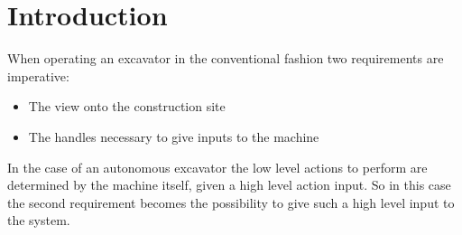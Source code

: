 \chapter{Introduction}
\label{sec:introduction}






When operating an excavator in the conventional fashion two requirements are imperative: \begin{itemize}
    \item The view onto the construction site
    \item The handles necessary to give inputs to the machine
\end{itemize}
In the case of an autonomous excavator the low level actions to perform are determined by the machine itself, given a high level action input. So in this case the second requirement becomes the possibility to give such a high level input to the system.

